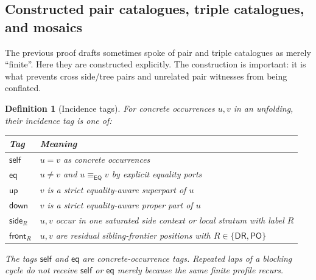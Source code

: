 \documentclass[11pt]{article}
\newtheorem{definition}[theorem]{Definition}
\newcommand{\EQ}{\mathsf{EQ}}
\newcommand{\DR}{\mathsf{DR}}
\newcommand{\PO}{\mathsf{PO}}
\newcommand{\eqc}{\equiv_{\EQ}}
\newcommand{\up}{\mathsf{up}}
\newcommand{\down}{\mathsf{down}}
\newcommand{\self}{\mathsf{self}}
\newcommand{\eqtag}{\mathsf{eq}}
\newcommand{\side}{\mathsf{side}}
\newcommand{\front}{\mathsf{front}}
\begin{document}
\subsection{Constructed pair catalogues, triple catalogues, and mosaics}\label{subsec:constructed-catalogues}

The previous proof drafts sometimes spoke of pair and triple catalogues as merely ``finite''.  Here they are constructed explicitly.  The construction is important: it is what prevents cross side/tree pairs and unrelated pair witnesses from being conflated.

\begin{definition}[Incidence tags]\label{def:incidence-tags}
For concrete occurrences $u,v$ in an unfolding, their incidence tag is one of:
\begin{center}
\begin{tabular}{ll}
\toprule
Tag & Meaning \\
\midrule
$\self$ & $u=v$ as concrete occurrences \\
$\eqtag$ & $u\ne v$ and $u\eqc v$ by explicit equality ports \\
$\up$ & $v$ is a strict equality-aware superpart of $u$ \\
$\down$ & $v$ is a strict equality-aware proper part of $u$ \\
$\side_R$ & $u,v$ occur in one saturated side context or local stratum with label $R$ \\
$\front_R$ & $u,v$ are residual sibling-frontier positions with $R\in\{\DR,\PO\}$ \\
\bottomrule
\end{tabular}
\end{center}
The tags $\self$ and $\eqtag$ are concrete-occurrence tags.  Repeated laps of a blocking cycle do not receive $\self$ or $\eqtag$ merely because the same finite profile recurs.
\end{definition}
\end{document}
